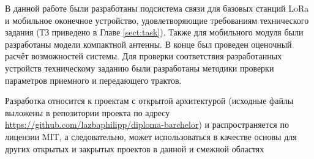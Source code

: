 
В данной работе были разработаны подсистема связи для базовых станций LoRa и мобильное оконечное устройство, удовлетворяющие требованиям технического задания (ТЗ приведено в Главе \ref{sect:task}). Также для мобильного модуля были разработаны модели компактной антенны. В конце был проведен оценочный расчёт возможностей системы. Для проверки соответствия разработанных устройств техническому заданию были разработаны методики проверки параметров  приемного и передающего трактов. 

Разработка относится к проектам с открытой архитектурой (исходные файлы выложены в репозитории проекта по адресу \url{https://github.com/lazbaphilipp/diploma-barchelor}) и распространяется по лицензии MIT, а следовательно, может использоваться в качестве основы для других открытых и закрытых проектов в данной и смежной областях